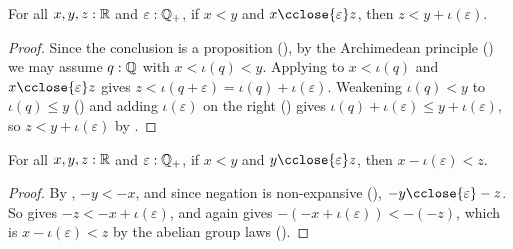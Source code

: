 \begin{lemma}
  \label{ltCloseLtAddRatReal}
  For all $x, y, z : \mathbb{R}$ and $\varepsilon : \mathbb{Q}_{+}$, if $x < y$ and $x \cclose{\varepsilon} z$, then $z < y + \iota(\varepsilon)$.
\end{lemma}
\begin{proof}
  Since the conclusion is a proposition (), by the Archimedean principle () we may assume $q : \mathbb{Q}$ with $x < \iota(q) < y$. Applying  to $x < \iota(q)$ and $x \cclose{\varepsilon} z$ gives $z < \iota(q + \varepsilon) = \iota(q) + \iota(\varepsilon)$. Weakening $\iota(q) < y$ to $\iota(q) \le y$ () and adding $\iota(\varepsilon)$ on the right () gives $\iota(q) + \iota(\varepsilon) \le y + \iota(\varepsilon)$, so $z < y + \iota(\varepsilon)$ by .
\end{proof}

\begin{corollary}
  \label{ltCloseSubRatLtReal}
  For all $x, y, z : \mathbb{R}$ and $\varepsilon : \mathbb{Q}_{+}$, if $x < y$ and $y \cclose{\varepsilon} z$, then $x - \iota(\varepsilon) < z$.
\end{corollary}
\begin{proof}
  By , $-y < -x$, and since negation is non-expansive (), $-y \cclose{\varepsilon} -z$. So  gives $-z < -x + \iota(\varepsilon)$, and  again gives $-(-x + \iota(\varepsilon)) < -(-z)$, which is $x - \iota(\varepsilon) < z$ by the abelian group laws ().
\end{proof}

